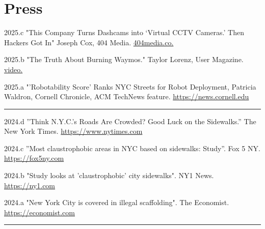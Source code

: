 \documentclass[10pt,letterpaper]{report}
\begin{document}
    \section*{Press}
        \begin{tablist}

            \item[2025.c] \tab{}"This Company Turns Dashcams into ‘Virtual CCTV Cameras.’ Then Hackers Got In" Joseph Cox, 404 Media. \href{https://www.404media.co/this-company-turns-dashcams-into-virtual-cctv-cameras-then-hackers-got-in/}{404media.co.}
            \item[2025.b] \tab{}"The Truth About Burning Waymos." Taylor Lorenz, User Magazine. \href{https://www.youtube.com/watch?v=pTOPOinAy_I&t=368s}{video.}

            \item[2025.a] \tab{}"'Robotability Score' Ranks NYC Streets for Robot Deployment, Patricia Waldron, Cornell Chronicle, ACM TechNews feature. \href{https://news.cornell.edu/stories/2025/04/robotability-score-ranks-nyc-streets-future-robot-deployment}{https://news.cornell.edu}

            \item[\rule{2em}{0.4pt}]
            
            \item[2024.d] \tab{}”Think N.Y.C.’s Roads Are Crowded? Good Luck on the Sidewalks.” The New York Times. \href{https://www.nytimes.com/2024/07/29/nyregion/street-wars-crowded-sidewalks-times-square.html}{https://www.nytimes.com}

            \item[2024.c] \tab{}”Most claustrophobic areas in NYC based on sidewalks: Study”. Fox 5 NY. \href{https://www.fox5ny.com/news/here-most-crowded-sidewalks-nyc}{https://fox5ny.com} 

            \item[2024.b] \tab{}"Study looks at 'claustrophobic' city sidewalks". NY1 News. \href{https://ny1.com/nyc/all-boroughs/CTV/2024/08/03/study-looks-at--claustrophobic--city-sidewalks.}{https://ny1.com}

            \item[2024.a] \tab{}"New York City is covered in illegal scaffolding". The Economist. \href{https://www.economist.com/science-and-technology/2024/03/13/new-york-city-is-covered-in-illegal-scaffolding}{https://economist.com}

            \item[\rule{2em}{0.4pt}]


\end{tablist}
\end{document}
